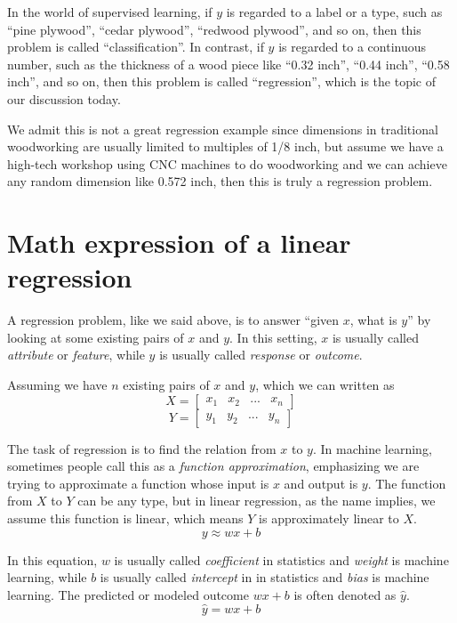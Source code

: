 \documentclass[
	letterpaper
]{article}
\begin{document}
In the world of supervised learning, if $y$ is regarded to a label or a type, such as ``pine plywood'', ``cedar plywood'', ``redwood plywood'', and so on, then this problem is called ``classification''.
In contrast, if $y$ is regarded to a continuous number, such as the thickness of a wood piece like ``0.32 inch'', ``0.44 inch'', ``0.58 inch'', and so on, then this problem is called ``regression'', which is the topic of our discussion today.

We admit this is not a great regression example since dimensions in traditional woodworking are usually limited to multiples of 1/8 inch, but assume we have a high-tech workshop using CNC machines to do woodworking and we can achieve any random dimension like 0.572 inch, then this is truly a regression problem.

\section{Math expression of a linear regression}
A regression problem, like we said above, is to answer ``given $x$, what is $y$'' by looking at some existing pairs of $x$ and $y$.
In this setting, $x$ is usually called \textit{attribute} or \textit{feature}, while $y$ is usually called \textit{response} or \textit{outcome}.

Assuming we have $n$ existing pairs of $x$ and $y$, which we can written as 
\begin{equation}
X = \begin{bmatrix}
x_1 & x_2 & ... & x_n
\end{bmatrix}
\end{equation}
\begin{equation}
Y = \begin{bmatrix}
y_1 & y_2 & ... & y_n
\end{bmatrix}
\end{equation}

The task of regression is to find the relation from $x$ to $y$.
In machine learning, sometimes people call this as a \textit{function approximation}, emphasizing we are trying to approximate a function whose input is $x$ and output is $y$.
The function from $X$ to $Y$ can be any type, but in linear regression, as the name implies, we assume this function is linear, which means $Y$ is approximately linear to $X$.
\begin{equation}
y \approx wx+b
\end{equation}

In this equation, $w$ is usually called \textit{coefficient} in statistics and \textit{weight} is machine learning, while $b$ is usually called \textit{intercept} in in statistics and \textit{bias} is machine learning.
The predicted or modeled outcome $wx+b$ is often denoted as $\hat y$.
\begin{equation}
\hat y = wx+b
\end{equation}
\end{document}
